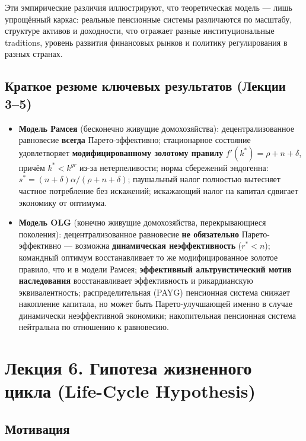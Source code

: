 \documentclass[10pt,a4paper]{article}
\begin{document}
\begin{intuition}
Эти эмпирические различия иллюстрируют, что теоретическая модель — лишь упрощённый каркас: реальные пенсионные системы различаются по масштабу, структуре активов и доходности, что отражает разные институциональные traditions, уровень развития финансовых рынков и политику регулирования в разных странах.
\end{intuition}

\subsection{Краткое резюме ключевых результатов (Лекции 3--5)}

\begin{itemize}[leftmargin=1.3em]
\item \textbf{Модель Рамсея} (бесконечно живущие домохозяйства): децентрализованное равновесие \textbf{всегда} Парето-эффективно; стационарное состояние удовлетворяет \textbf{модифицированному золотому правилу} $f'(k^{*})=\rho+n+\delta$, причём $k^{*}<k^{gr}$ из-за нетерпеливости; норма сбережений эндогенна: $s^{*}=(n+\delta)\alpha/(\rho+n+\delta)$; паушальный налог полностью вытесняет частное потребление без искажений; искажающий налог на капитал сдвигает экономику от оптимума.
\item \textbf{Модель OLG} (конечно живущие домохозяйства, перекрывающиеся поколения): децентрализованное равновесие \textbf{не обязательно} Парето-эффективно — возможна \textbf{динамическая неэффективность} ($r^{*}<n$); командный оптимум восстанавливает то же модифицированное золотое правило, что и в модели Рамсея; \textbf{эффективный альтруистический мотив наследования} восстанавливает эффективность и рикардианскую эквивалентность; распределительная (PAYG) пенсионная система снижает накопление капитала, но может быть Парето-улучшающей именно в случае динамически неэффективной экономики; накопительная пенсионная система нейтральна по отношению к равновесию.
\end{itemize}

\newpage
\section{Лекция 6. Гипотеза жизненного цикла (Life-Cycle Hypothesis)}

\subsection{Мотивация}
\end{document}
